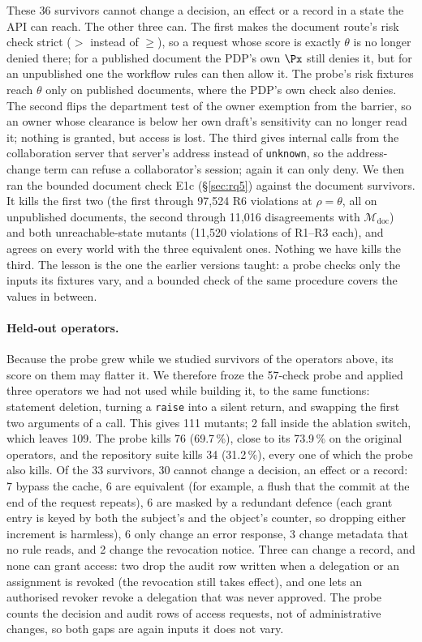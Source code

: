 These 36 survivors cannot change a decision, an effect or a record in a state the API can reach. The other three
can. The first makes the document route's risk check strict ($>$ instead of $\geq$), so a request whose score is
exactly $\theta$ is no longer denied there; for a published document the PDP's own $\Px$ still denies it, but for
an unpublished one the workflow rules can then allow it. The probe's risk fixtures reach $\theta$ only on published documents, where the PDP's own check also denies.
The second flips the department test of the owner exemption from the barrier, so an owner whose clearance is
below her own draft's sensitivity can no longer read it; nothing is granted, but access is lost. The third gives
internal calls from the collaboration server that server's address instead of \texttt{unknown}, so the
address-change term can refuse a collaborator's session; again it can only deny. We then ran the bounded
document check E1c (\S\ref{sec:rq5}) against the document survivors. It kills the first two (the first through
97{,}524 R6 violations at $\rho=\theta$, all on unpublished documents, the second through 11{,}016 disagreements
with $\mathcal{M}_{\mathrm{doc}}$) and both unreachable-state mutants (11{,}520 violations of R1--R3 each), and agrees on every world with the three equivalent ones.
Nothing we have kills the third. The lesson is the one the earlier versions taught: a probe checks only the
inputs its fixtures vary, and a bounded check of the same procedure covers the values in between.

\paragraph{Held-out operators.} Because the probe grew while we studied survivors of the operators above, its
score on them may flatter it. We therefore froze the 57-check probe and applied three operators we had not used
while building it, to the same functions: statement deletion, turning a \texttt{raise} into a silent return, and
swapping the first two arguments of a call. This gives 111 mutants; 2 fall inside the ablation switch, which
leaves 109. The probe kills 76 (69.7\,\%), close to its 73.9\,\% on the original operators, and the repository
suite kills 34 (31.2\,\%), every one of which the probe also kills. Of the 33 survivors, 30 cannot change a
decision, an effect or a record: 7 bypass the cache, 6 are equivalent (for example, a flush that the commit at
the end of the request repeats), 6 are masked by a redundant defence (each grant entry is keyed by both the
subject's and the object's counter, so dropping either increment is harmless), 6 only change an error response,
3 change metadata that no rule reads, and 2 change the revocation notice. Three can change a record, and none can
grant access: two drop the audit row written when a delegation or an assignment is revoked (the revocation still
takes effect), and one lets an authorised revoker revoke a delegation that was never approved. The probe counts
the decision and audit rows of access requests, not of administrative changes, so both gaps are again inputs it
does not vary.

